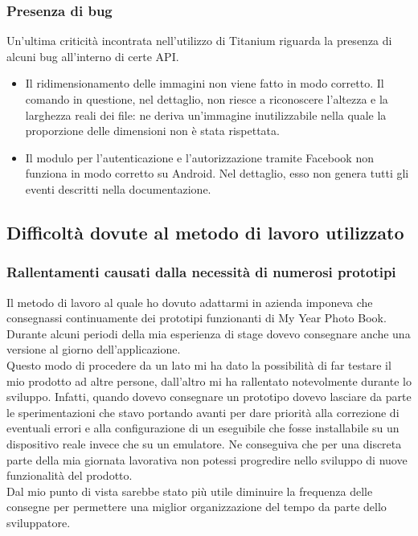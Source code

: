 			\subsubsection{Presenza di bug}
				Un'ultima criticità incontrata nell'utilizzo di Titanium riguarda la presenza di alcuni bug all'interno di certe API.
				\begin{itemize}
					\item Il ridimensionamento delle immagini non viene fatto in modo corretto. Il comando in questione, nel
					dettaglio, non riesce a riconoscere l'altezza e la larghezza reali dei file: ne deriva un'immagine
					inutilizzabile nella quale la proporzione delle dimensioni non è stata rispettata.
					\item Il modulo per l'autenticazione e l'autorizzazione tramite Facebook non funziona in modo corretto su
					Android. Nel dettaglio, esso non genera tutti gli eventi descritti nella documentazione.
				\end{itemize}
		\subsection{Difficoltà dovute al metodo di lavoro utilizzato}
			\subsubsection{Rallentamenti causati dalla necessità di numerosi prototipi}
				Il metodo di lavoro al quale ho dovuto adattarmi in azienda imponeva che consegnassi continuamente dei prototipi
				funzionanti di My Year Photo Book. Durante alcuni periodi della mia esperienza di stage dovevo consegnare anche una
				versione al giorno dell'applicazione.\\
				Questo modo di procedere da un lato mi ha dato la possibilità di far testare il mio prodotto ad altre persone,
				dall'altro mi ha rallentato notevolmente durante lo sviluppo. Infatti, quando dovevo consegnare un prototipo dovevo
				lasciare da parte le sperimentazioni che stavo portando avanti per dare priorità alla correzione di eventuali errori
				e alla configurazione di un eseguibile che fosse installabile su un dispositivo reale invece che su un emulatore. Ne
				conseguiva che per una discreta parte della mia giornata lavorativa non potessi progredire nello sviluppo di nuove
				funzionalità del prodotto.\\
				Dal mio punto di vista sarebbe stato più utile diminuire la frequenza delle consegne per permettere una miglior
				organizzazione del tempo da parte dello sviluppatore.
